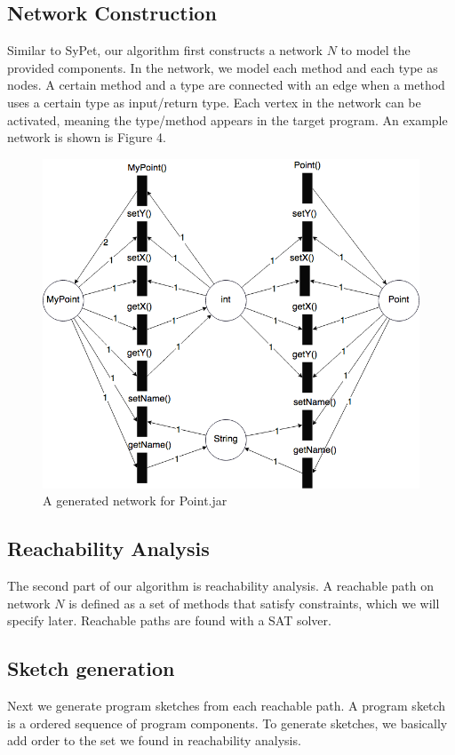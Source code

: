 \documentclass[twocolumn]{article}
\begin{document}
\subsection{Network Construction}
Similar to SyPet, our algorithm first constructs a network $N$ to model the provided components. In the network, we model each method and each type as nodes. A certain method and a type are connected with an edge when a method uses a certain type as input/return type. Each vertex in the network can be activated, meaning the type/method appears in the target program. An example network is shown is Figure 4.\\
\begin{figure}[H]
\centering
\includegraphics[scale = 0.3]{point.png}
\caption{A generated network for Point.jar}
\end{figure}
\subsection{Reachability Analysis}
The second part of our algorithm is reachability analysis. A reachable path on network $N$ is defined as a set of methods that satisfy constraints, which we will specify later. Reachable paths are found with a SAT solver.\\ 
\subsection{Sketch generation}
Next we generate program sketches from each reachable path. A program sketch is a ordered sequence of program components. To generate sketches, we basically add order to the set we found in reachability analysis.\\
\end{document}
